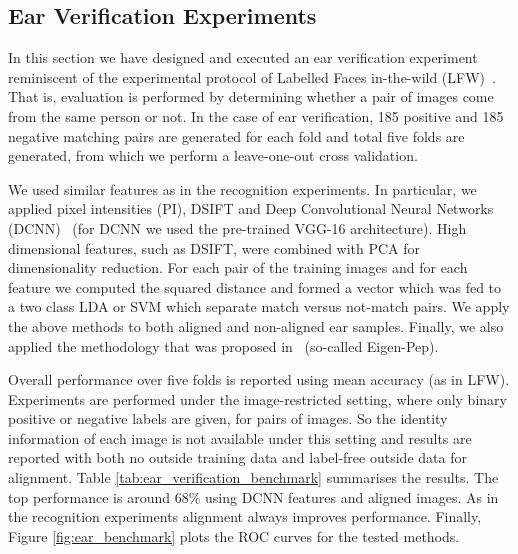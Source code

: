 \subsection{Ear Verification Experiments}

In this section we have designed and executed an ear verification experiment reminiscent of the experimental protocol of Labelled Faces in-the-wild (LFW)~\cite{huang2007labeled}.  That is, evaluation is performed by determining whether a pair of images come from the same person or not. In the case of ear verification, 185 positive and 185 negative matching pairs are generated for each fold and total five folds are generated, from which we perform a leave-one-out cross validation.

We used similar features as in the recognition experiments. In particular, we applied pixel intensities (PI), DSIFT and Deep Convolutional Neural Networks (DCNN)~\cite{simonyan2014very} (for DCNN we used the pre-trained VGG-16 architecture). High dimensional features, such as DSIFT, were combined with PCA for dimensionality reduction. For each pair of the training images and for each feature we computed the squared distance and formed a vector which was fed to a two class LDA or SVM which separate match versus not-match pairs. We apply the above methods to both aligned and non-aligned ear samples. Finally, we also applied the methodology that was proposed in~\cite{li2014eigen} (so-called Eigen-Pep).


Overall performance over five folds is reported using mean accuracy (as in LFW). Experiments are performed under the image-restricted setting, where only binary positive or negative labels are given, for pairs of images. So the identity information of each image is not available under this setting and results are reported with both no outside training data and label-free outside data for alignment. Table \ref{tab:ear_verification_benchmark} summarises the results. The top performance is around 68$\%$ using DCNN features and aligned images. As in the recognition experiments alignment always improves performance. Finally, Figure  \ref{fig:ear_benchmark} plots the ROC curves for the tested methods.





